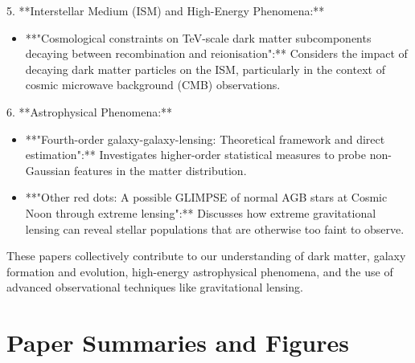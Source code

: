 \documentclass[11pt]{article}
\begin{document}
5. **Interstellar Medium (ISM) and High-Energy Phenomena:**
\begin{itemize}
\item **"Cosmological constraints on TeV-scale dark matter subcomponents decaying between recombination and reionisation":** Considers the impact of decaying dark matter particles on the ISM, particularly in the context of cosmic microwave background (CMB) observations.
\end{itemize}
6. **Astrophysical Phenomena:**
\begin{itemize}
\item **"Fourth-order galaxy-galaxy-lensing: Theoretical framework and direct estimation":** Investigates higher-order statistical measures to probe non-Gaussian features in the matter distribution.
\item **"Other red dots: A possible GLIMPSE of normal AGB stars at Cosmic Noon through extreme lensing":** Discusses how extreme gravitational lensing can reveal stellar populations that are otherwise too faint to observe.
\end{itemize}
These papers collectively contribute to our understanding of dark matter, galaxy formation and evolution, high-energy astrophysical phenomena, and the use of advanced observational techniques like gravitational lensing.
\newpage
\section*{Paper Summaries and Figures}
\end{document}
